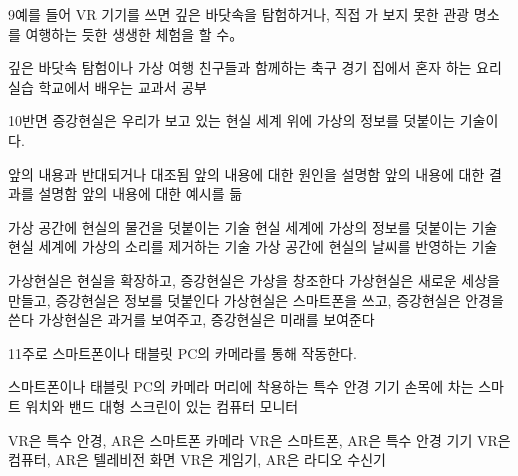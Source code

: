 \documentclass[fs85,seriesRus]{korfarm-base}
\begin{document}
\begin{kfSentenceUnit}{9}{예를 들어 VR 기기를 쓰면 깊은 바닷속을 탐험하거나, 직접 가 보지 못한 관광 명소를 여행하는 듯한 생생한 체험을 할 수。}
\begin{kfChoices}
\kfChoice 깊은 바닷속 탐험이나 가상 여행
\kfChoice 친구들과 함께하는 축구 경기
\kfChoice 집에서 혼자 하는 요리 실습
\kfChoice 학교에서 배우는 교과서 공부
\end{kfChoices}
\end{kfSentenceUnit}

\begin{kfSentenceUnit}{10}{반면 증강현실은 우리가 보고 있는 현실 세계 위에 가상의 정보를 덧붙이는 기술이다.}
\begin{kfChoices}
\kfChoice 앞의 내용과 반대되거나 대조됨
\kfChoice 앞의 내용에 대한 원인을 설명함
\kfChoice 앞의 내용에 대한 결과를 설명함
\kfChoice 앞의 내용에 대한 예시를 듦
\end{kfChoices}
\begin{kfChoices}
\kfChoice 가상 공간에 현실의 물건을 덧붙이는 기술
\kfChoice 현실 세계에 가상의 정보를 덧붙이는 기술
\kfChoice 현실 세계에 가상의 소리를 제거하는 기술
\kfChoice 가상 공간에 현실의 날씨를 반영하는 기술
\end{kfChoices}
\begin{kfChoices}
\kfChoice 가상현실은 현실을 확장하고, 증강현실은 가상을 창조한다
\kfChoice 가상현실은 새로운 세상을 만들고, 증강현실은 정보를 덧붙인다
\kfChoice 가상현실은 스마트폰을 쓰고, 증강현실은 안경을 쓴다
\kfChoice 가상현실은 과거를 보여주고, 증강현실은 미래를 보여준다
\end{kfChoices}
\end{kfSentenceUnit}

\begin{kfSentenceUnit}{11}{주로 스마트폰이나 태블릿 PC의 카메라를 통해 작동한다.}
\begin{kfChoices}
\kfChoice 스마트폰이나 태블릿 PC의 카메라
\kfChoice 머리에 착용하는 특수 안경 기기
\kfChoice 손목에 차는 스마트 워치와 밴드
\kfChoice 대형 스크린이 있는 컴퓨터 모니터
\end{kfChoices}
\begin{kfChoices}
\kfChoice VR은 특수 안경, AR은 스마트폰 카메라
\kfChoice VR은 스마트폰, AR은 특수 안경 기기
\kfChoice VR은 컴퓨터, AR은 텔레비전 화면
\kfChoice VR은 게임기, AR은 라디오 수신기
\end{kfChoices}
\end{kfSentenceUnit}
\end{document}
